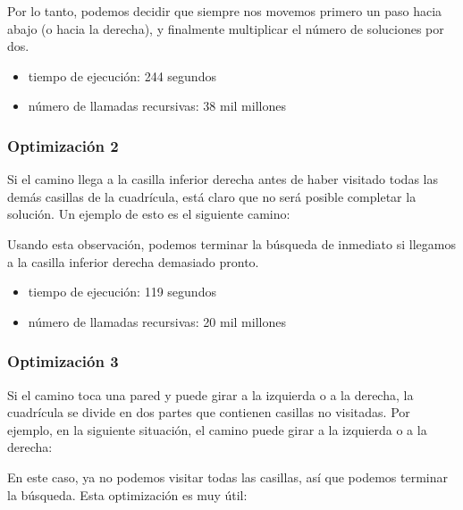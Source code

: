 Por lo tanto, podemos decidir que siempre nos movemos
primero un paso hacia abajo (o hacia la derecha),
y finalmente multiplicar el número de soluciones por dos.

\begin{itemize}
\item
tiempo de ejecución: 244 segundos
\item
número de llamadas recursivas: 38 mil millones
\end{itemize}

\subsubsection{Optimización 2}

Si el camino llega a la casilla inferior derecha
antes de haber visitado todas las demás casillas de la cuadrícula,
está claro que
no será posible completar la solución.
Un ejemplo de esto es el siguiente camino:

\begin{center}
\end{center}
Usando esta observación, podemos terminar la búsqueda
de inmediato si llegamos a la casilla inferior derecha demasiado pronto.
\begin{itemize}
\item
tiempo de ejecución: 119 segundos
\item
número de llamadas recursivas: 20 mil millones
\end{itemize}

\subsubsection{Optimización 3}

Si el camino toca una pared
y puede girar a la izquierda o a la derecha,
la cuadrícula se divide en dos partes
que contienen casillas no visitadas.
Por ejemplo, en la siguiente situación,
el camino puede girar a la izquierda o a la derecha:

\begin{center}
\end{center}
En este caso, ya no podemos visitar todas las casillas,
así que podemos terminar la búsqueda.
Esta optimización es muy útil:

